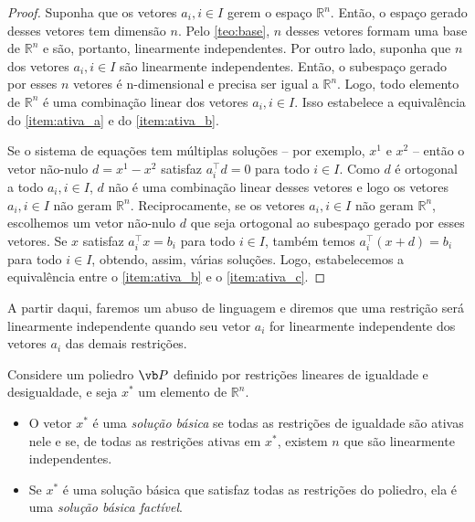 \begin{proof}
Suponha que os vetores $a_i, i\in I$ gerem o espaço $\mathbb{R}^n$. Então, o espaço gerado desses vetores tem dimensão $n$. Pelo \cref{teo:base}, $n$ desses vetores formam uma base de $\mathbb{R}^n$ e são, portanto, linearmente independentes. Por outro lado, suponha que $n$ dos vetores $a_i, i\in I$ são linearmente independentes. Então, o subespaço gerado por esses $n$ vetores é n-dimensional e precisa ser igual a $\mathbb{R}^n$. Logo, todo elemento de $\mathbb{R}^n$ é uma combinação linear dos vetores $a_i, i \in I$. Isso estabelece a equivalência do \cref{item:ativa_a} e do \cref{item:ativa_b}.

Se o sistema de equações tem múltiplas soluções -- por exemplo, $x^1$ e $x^2$ -- então o vetor não-nulo $d = x^1 - x^2$ satisfaz $a_i^\intercal d = 0$ para todo $i\in I$. Como $d$ é ortogonal a todo $a_i, i\in I$, $d$ não é uma combinação linear desses vetores e logo os vetores $a_i, i\in I$ não geram $\mathbb{R}^n$. Reciprocamente, se os vetores $a_i, i \in I$ não geram $\mathbb{R}^n$,  escolhemos um vetor não-nulo $d$ que seja ortogonal ao subespaço gerado por esses vetores. Se $x$ satisfaz $a_i^\intercal x = b_i$ para todo $i\in I$, também temos $a^\intercal _i(x+d)=b_i$ para todo $i\in I$, obtendo, assim, várias soluções. Logo, estabelecemos a equivalência entre o \cref{item:ativa_b} e o \cref{item:ativa_c}.
\end{proof}

A partir daqui, faremos um abuso de linguagem e diremos que uma restrição será linearmente independente quando seu vetor $a_i$ for linearmente independente dos vetores $a_i$ das demais restrições.

\begin{mydef}\label{def:sbf}
 Considere um poliedro $\vb P$ definido por restrições lineares de igualdade e desigualdade, e seja $x^*$ um elemento de $\mathbb{R}^n$.
 \begin{itemize}
 \item O vetor $x^*$ é uma \emph{solução básica} se todas as restrições de igualdade são ativas nele e se, de todas as restrições ativas em $x^*$, existem $n$ que são linearmente independentes.
 \item Se $x^*$ é uma solução básica que satisfaz todas as restrições do poliedro, ela é uma \emph{solução básica factível}.
\end{itemize}
\end{mydef}

